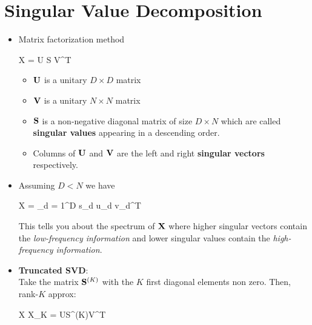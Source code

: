\section{Singular Value Decomposition}
\begin{itemize}
	\item Matrix factorization method
	\begin{myalign*}
	    \*X = \*U \*S \*V^T
	\end{myalign*}
	\begin{itemize}
		\item $\mathbf{U}$ is a unitary $D \times D$ matrix
		\item $\mathbf{V}$ is a unitary $N \times N$ matrix
		\item $\mathbf{S}$ is a non-negative diagonal matrix of size $D \times N$ which are called \textbf{singular values} appearing in a descending order.
		\item Columns of $\mathbf{U}$ and $\mathbf{V}$ are the left and right \textbf{singular vectors} respectively.
	\end{itemize}
	\item Assuming $D < N$ we have
	\begin{myalign*}
	    \*X = \sum_{d = 1}^D s_d \*u_d \*v_d^T
	\end{myalign*}
	This tells you about the spectrum of $\mathbf{X}$ where higher singular vectors contain the \textit{low-frequency information} and lower singular values contain the \textit{high-frequency information}. 
	\item {\bf Truncated SVD}: \\
	Take the matrix $\mathbf{S}^{(K)}$ with the $K$ first diagonal elements non zero. Then, rank-$K$ approx:	
	\begin{myalign*}
		\*X \approx \*X_K = \*U\*S^{(K)}\*V^T
	\end{myalign*}
	
\end{itemize}

